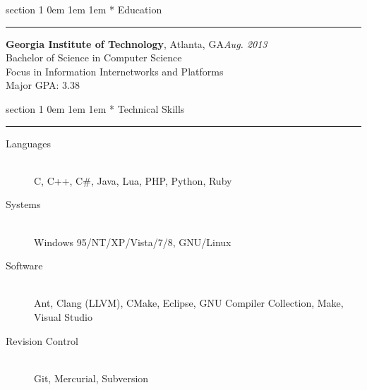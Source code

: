 \documentclass{article}
\makeatletter
\newcommand{\name}[1]{\def \@name {#1}}
\newcommand{\streetaddress}[1]{\def \@streetaddress {#1}}
\newcommand{\citystatezip}[1]{\def \@citystatezip {#1}}
\newcommand{\phone}[1]{\def \@phone {#1}}
\newcommand{\email}[1]{\def \@email {#1}}
\newcommand{\website}[1]{\def \@website {#1}}
\renewcommand{\section}[1]{
	\vspace{0.75em}
	\@startsection
	{section}
	{1}
	{\z@}
	{0em}
	{1em \@minus 1em} %
	{\normalfont\large\sc\bfseries}
	*
	{#1}
	\vspace{-0.75em} %
	\hrule
	\par
}
\newcommand{\entry}[1]{\def \@entry {#1}}
\newcommand{\dates}[1]{\def \@dates {#1}}
\newcommand{\location}[1]{\def \@location {#1}}
\newenvironment{locationentry}{
	\vspace{0.5em}
	{\bf \@entry}, \@location \hfill {\it \@dates} \\
}{}
\makeatother
\begin{document}
\name{Robert Kernan}
\phone{(770) 355-4050}
\streetaddress{16 Arbor Way Drive}
\citystatezip{Decatur, GA 30030}
\email{rkernan@gmail.com}
\website{robertkernan.com}

\maketitle

\thispagestyle{empty}


\section{Education}


\entry{Georgia Institute of Technology}
\location{Atlanta, GA}
\dates{Aug. 2013}
\begin{locationentry}
	Bachelor of Science in Computer Science \\
	Focus in Information Internetworks and Platforms \\
	Major GPA: 3.38 \\
\end{locationentry}

\section{Technical Skills}
\vspace{0.5em}
\begin{description}
	\item[Languages] \hfill \\
		C, C++, C\#, Java, Lua, PHP, Python, Ruby
	\item[Systems] \hfill \\
		Windows 95/NT/XP/Vista/7/8, GNU/Linux
	\item[Software] \hfill \\
		Ant, Clang (LLVM), CMake, Eclipse, GNU Compiler Collection, Make, Visual
		Studio
	\item[Revision Control] \hfill \\
		Git, Mercurial, Subversion
\end{description}
\end{document}
